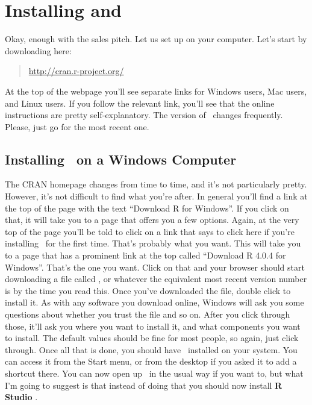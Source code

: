 
\chapter{Installing  \R and \Rstudio }\label{sec:gettingR}


Okay, enough with the sales pitch. Let us set up \R on your computer. Let's start by downloading \R  here:
\begin{quote}
	\url{http://cran.r-project.org/}
\end{quote}
At the top of the webpage you'll see separate links for Windows users, Mac users, and Linux users. If you follow the relevant link, you'll see that the online instructions are pretty self-explanatory. The version of  \R\  changes frequently. Please, just go for the most recent one.

\section{Installing \R\ on a Windows Computer}

The CRAN homepage changes from time to time, and it's not particularly pretty. However, it's not difficult to find what you're after. In general you'll find a link at the top of the page with the text ``Download R for Windows''. If you click on that, it will take you to a page that offers you a few options. Again, at the very top of the page you'll be told to click on a link that says to click here if you're installing \R\ for the first time. That's probably what you want. This will take you to a page that has a prominent link at the top called ``Download R 4.0.4 for Windows''. That's the one you want. Click on that and your browser should start downloading a file called , or whatever the equivalent most recent version number is by the time you read this. Once you've downloaded the file, double click to install it. As with any software you download online, Windows will ask you some questions about whether you trust the file and so on. After you click through those, it'll ask you where you want to install it, and what components you want to install. The default values should be fine for most people, so again, just click through. Once all that is done, you should have  \R\  installed on your system. You can access it from the Start menu, or from the desktop if you asked it to add a shortcut there. You can now open up \R\ in the usual way if you want to, but what I'm going to suggest is that instead of doing that you should now install \textbf{R Studio} \Rstudio.

